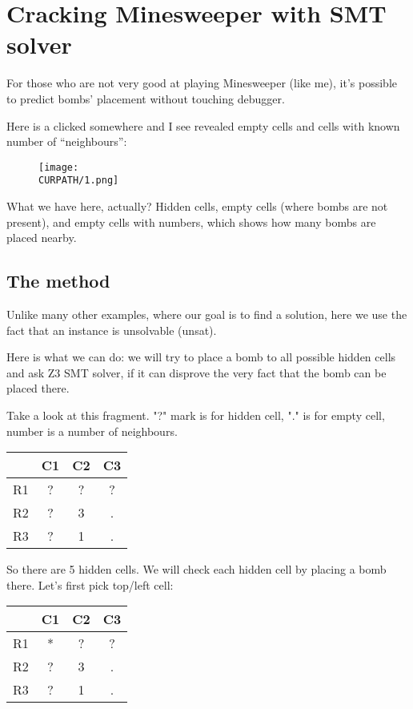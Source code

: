 \section{Cracking Minesweeper with SMT solver}
\label{minesweeper_SMT}

\renewcommand{\CURPATH}{equations/minesweeper_SMT}

For those who are not very good at playing Minesweeper (like me), it's possible to predict bombs' placement without touching debugger.

Here is a clicked somewhere and I see revealed empty cells and cells with known number of ``neighbours'':

\begin{figure}[H]
\centering
\texttt{[image: \\CURPATH/1.png]}
\end{figure}

What we have here, actually? Hidden cells, empty cells (where bombs are not present), and empty cells with numbers, which shows how many bombs are placed nearby.

\subsection{The method}

Unlike many other examples, where our goal is to find a solution, here we use the fact that an instance is unsolvable (unsat).

Here is what we can do: we will try to place a bomb to all possible hidden cells and ask Z3 SMT solver,
if it can disprove the very fact that the bomb can be placed there.

Take a look at this fragment. "?" mark is for hidden cell, "." is for empty cell, number is a number of neighbours.

\begin{center}
\begin{tabular}{ | c | c | c | c | }
\hline
 & C1 & C2 & C3 \\
\hline
R1 & ? & ? & ? \\
\hline
R2 & ? & 3 & . \\
\hline
R3 & ? & 1 & . \\
\hline
\end{tabular}
\end{center}

So there are 5 hidden cells.
We will check each hidden cell by placing a bomb there.
Let's first pick top/left cell:

\begin{center}
\begin{tabular}{ | c | c | c | c | }
\hline
 & C1 & C2 & C3 \\
\hline
R1 & * & ? & ? \\
\hline
R2 & ? & 3 & . \\
\hline
R3 & ? & 1 & . \\
\hline
\end{tabular}
\end{center}

